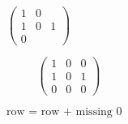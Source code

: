 \documentclass[10pt]{book}
\begin{document}
\begin{mdSnippets}
\begin{mdInlineSnippet}[547e618df84b6e68ae941fbd47e90df9]%
$\begin{pmatrix} 1 & 0 &   \\1 & 0 & 1 \\0 &   & \end{pmatrix}\qquad\text{ }$\end{mdInlineSnippet}%
\begin{mdInlineSnippet}%
$\text{ }\qquad\begin{pmatrix}1 & 0 & 0 \\1 & 0 & 1 \\0 & 0 & 0\end{pmatrix}$\end{mdInlineSnippet}%
\begin{mdInlineSnippet}%
$\text{row = row + missing 0}$\end{mdInlineSnippet}%

\end{mdSnippets}
\end{document}
